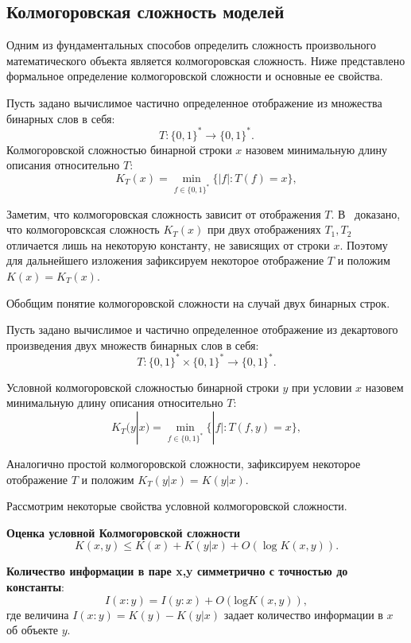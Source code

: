 \documentclass[../main.tex]{subfiles}
\begin{document}
\subsection{Колмогоровская сложность моделей}

Одним из фундаментальных способов определить сложность произвольного математического объекта является колмогоровская сложность. Ниже представлено формальное определение колмогоровской сложности и основные ее свойства.


\begin{definition}
Пусть задано вычислимое частично определенное отображение из множества бинарных слов в себя:
\[
T: \{0,1\}^{*}  \to  \{0,1\}^{*}.
\]
Колмогоровской сложностью бинарной строки $x$ назовем минимальную длину описания относительно $T$:
\[
K_T(x) = \min_{f \in \{0,1\}^*}\{|f|: T(f) = x\},
\]
\end{definition}
Заметим, что колмогоровская сложность зависит от отображения $T$. В~\cite{kolmogorov} доказано, что колмогоровсксая сложность $K_T(x)$ при двух отображениях $T_1, T_2$ отличается лишь на некоторую константу, не зависящих от строки $x$. Поэтому для дальнейшего изложения зафиксируем некоторое отображение $T$ и положим $K(x) = K_T(x)$.


Обобщим понятие колмогоровской сложности на случай двух бинарных строк.

\begin{definition}
Пусть задано вычислимое и частично определенное отображение из декартового произведения двух множеств бинарных слов в себя:
\[
T: \{0,1\}^{*} \times  \{0,1\}^{*} \to  \{0,1\}^{*}.
\]

Условной колмогоровской сложностью бинарной строки $y$ при условии $x$ назовем минимальную длину описания относительно $T$:
\[
K_T(y|x) = \min_{f \in \{0,1\}^*}\{|f|: T(f, y) = x\},
\]
\end{definition}
Аналогично простой колмогоровской сложности, зафиксируем некоторое отображение $T$ и положим $K_T(y|x) = K(y|x)$.

Рассмотрим некоторые свойства условной колмогоровской сложности.


\textbf{Оценка условной Колмогоровской сложности}~\cite{kolmogorov}
\[
	K(x,y) \leq K(x) + K(y|x) + O(\log K(x,y)).
\]


\textbf{Количество информации в паре x,y симметрично с точностью до константы}:
\[
I(x:y) = I(y:x) + O(\text{log}K(x,y)),
\]
где величина $I(x:y) = K(y) - K(y|x)$  задает количество информации в $x$ об объекте $y$. 
\end{document}
